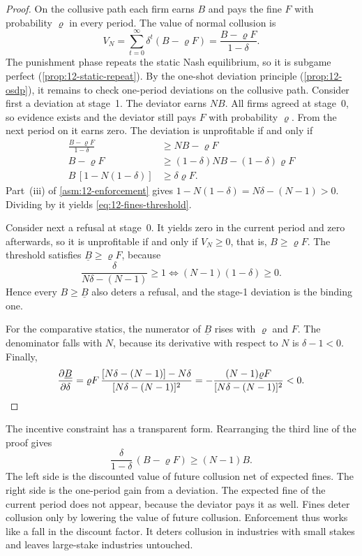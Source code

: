 \begin{proof}
On the collusive path each firm earns $B$ and pays the fine $F$ with probability $\varrho$ in every period. The value
of normal collusion is
\begin{equation}\label{eq:12-fines-VN}
V_N = \sum_{t=0}^{\infty}\delta^t (B - \varrho F) = \frac{B - \varrho F}{1-\delta}.
\end{equation}
The punishment phase repeats the static Nash equilibrium, so it is subgame perfect (\cref{prop:12-static-repeat}). By
the one-shot deviation principle (\cref{prop:12-osdp}), it remains to check one-period deviations on the collusive
path. Consider first a deviation at stage~1. The deviator earns $NB$. All firms agreed at stage~0, so evidence exists
and the deviator still pays $F$ with probability $\varrho$. From the next period on it earns zero. The deviation is
unprofitable if and only if
\begin{align*}
\frac{B - \varrho F}{1-\delta} &\ge NB - \varrho F\\
B - \varrho F &\ge (1-\delta)NB - (1-\delta)\varrho F\\
B\,[1 - N(1-\delta)] &\ge \delta\varrho F.
\end{align*}
Part~(iii) of \cref{asm:12-enforcement} gives $1 - N(1-\delta) = N\delta - (N-1) > 0$. Dividing by it yields
\eqref{eq:12-fines-threshold}.

Consider next a refusal at stage~0. It yields zero in the current period and zero afterwards, so it is unprofitable
if and only if $V_N \ge 0$, that is, $B \ge \varrho F$. The threshold satisfies $\underline B \ge \varrho F$, because
\begin{equation*}
\frac{\delta}{N\delta - (N-1)} \ge 1 \iff (N-1)(1-\delta) \ge 0.
\end{equation*}
Hence every $B \ge \underline B$ also deters a refusal, and the stage-1 deviation is the binding one.

For the comparative statics, the numerator of $\underline B$ rises with $\varrho$ and $F$. The denominator falls with
$N$, because its derivative with respect to $N$ is $\delta - 1 < 0$. Finally,
\begin{equation*}
\frac{\partial \underline B}{\partial \delta}
= \varrho F\,\frac{[N\delta - (N-1)] - N\delta}{[N\delta - (N-1)]^2}
= -\frac{(N-1)\varrho F}{[N\delta - (N-1)]^2} < 0. \qedhere
\end{equation*}
\end{proof}

The incentive constraint has a transparent form. Rearranging the third line of the proof gives
\begin{equation}\label{eq:12-fines-ic}
\frac{\delta}{1-\delta}\,(B - \varrho F) \ge (N-1)B.
\end{equation}
The left side is the discounted value of future collusion net of expected fines. The right side is the one-period
gain from a deviation. The expected fine of the current period does not appear, because the deviator pays it as
well. Fines deter collusion only by lowering the value of future collusion. Enforcement thus works like a fall in
the discount factor. It deters collusion in industries with small stakes and leaves large-stake industries
untouched.

